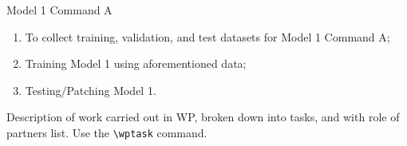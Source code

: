 
\begin{workpackage}{Model 1 Command A}
  \label{wp:m1cA} %



  \makewptable %
    
  \begin{wpobjectives}
    \begin{enumerate}
    \item To collect training, validation, and test datasets for 
Model 1 Command A; 
    \item Training Model 1 using aforementioned data;
    \item Testing/Patching Model 1.
    \end{enumerate}
  \end{wpobjectives}
  
  \begin{wpdescription}
 
    Description of work carried out in WP, broken down into tasks, and
    with role of partners list. Use the \texttt{\textbackslash wptask} command.

    
   
  \end{wpdescription}
  

\end{workpackage}
